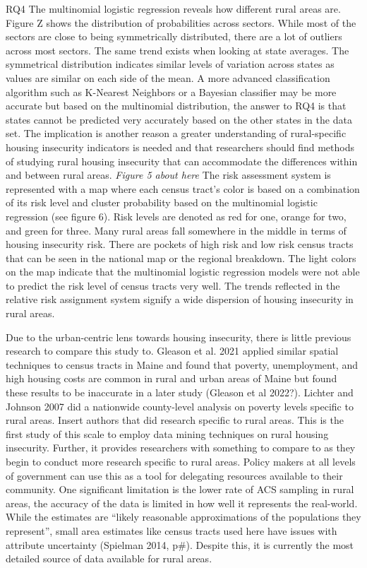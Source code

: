 RQ4 The multinomial logistic regression reveals how different rural areas are. Figure Z shows the distribution of probabilities across sectors. While most of the sectors are close to being symmetrically distributed, there are a lot of outliers across most sectors. The same trend exists when looking at state averages. The symmetrical distribution indicates similar levels of variation across states as values are similar on each side of the mean. A more advanced classification algorithm such as K-Nearest Neighbors or a Bayesian classifier may be more accurate but based on the multinomial distribution, the answer to RQ4 is that states cannot be predicted very accurately based on the other states in the data set. The implication is another reason a greater understanding of rural-specific housing insecurity indicators is needed and that researchers should find methods of studying rural housing insecurity that can accommodate the differences within and between rural areas. 
\textit{Figure 5 about here}
The risk assessment system is represented with a map where each census tract’s color is based on a combination of its risk level and cluster probability based on the multinomial logistic regression (see figure 6). Risk levels are denoted as red for one, orange for two, and green for three. Many rural areas fall somewhere in the middle in terms of housing insecurity risk. There are pockets of high risk and low risk census tracts that can be seen in the national map or the regional breakdown. The light colors on the map indicate that the multinomial logistic regression models were not able to predict the risk level of census tracts very well. The trends reflected in the relative risk assignment system signify a wide dispersion of housing insecurity in rural areas.  

Due to the urban-centric lens towards housing insecurity, there is little previous research to compare this study to. Gleason et al. 2021 applied similar spatial techniques to census tracts in Maine and found that poverty, unemployment, and high housing costs are common in rural and urban areas of Maine but found these results to be inaccurate in a later study (Gleason et al 2022?). Lichter and Johnson 2007 did a nationwide county-level analysis on poverty levels specific to rural areas. Insert authors that did research specific to rural areas. This is the first study of this scale to employ data mining techniques on rural housing insecurity. Further, it provides researchers with something to compare to as they begin to conduct more research specific to rural areas. Policy makers at all levels of government can use this as a tool for delegating resources available to their community. One significant limitation is the lower rate of ACS sampling in rural areas, the accuracy of the data is limited in how well it represents the real-world. While the estimates are “likely reasonable approximations of the populations they represent”, small area estimates like census tracts used here have issues with attribute uncertainty (Spielman 2014, p\#). Despite this, it is currently the most detailed source of data available for rural areas.  

